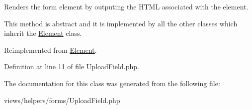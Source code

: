 Renders the form element by outputing the HTML associated with the element. 

This method is abstract and it is implemented by all the other classes which inherit the \hyperlink{class_element}{Element} class. 

Reimplemented from \hyperlink{class_element_a8fd45d1d43cf11f3dadab39b0306a960}{Element}.



Definition at line 11 of file UploadField.php.



The documentation for this class was generated from the following file:\begin{DoxyCompactItemize}
\item 
views/helpers/forms/UploadField.php\end{DoxyCompactItemize}
